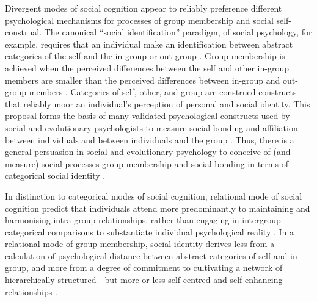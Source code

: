 \begin{CJK}{UTF8}{gbsn}
Divergent modes of social cognition appear to reliably preference different psychological mechanisms for processes of group membership and social self-construal.  The canonical ``social identification'' paradigm, of social psychology, for example, requires that an individual make an identification between abstract categories of the self and the in-group or out-group \citep{Turner1987}. Group membership is achieved when the perceived differences between the self and other in-group members are smaller than the perceived differences between in-group and out-group members \citep{Yuki2014}. Categories of self, other, and group are construed constructs that reliably moor an individual's perception of personal and social identity.  This proposal forms the basis of many validated psychological constructs used by social and evolutionary psychologists to measure social bonding and affiliation between individuals and between individuals and the group \citep{Swann2009,Wolf2015}.  Thus, there is a general persuasion in social and evolutionary psychology to conceive of (and measure) social processes group membership and social bonding in terms of categorical social identity \citep{Liu2015a}.


In distinction to categorical modes of social cognition, relational mode of social cognition predict that individuals attend more predominantly to maintaining and harmonising intra-group relationships, rather than engaging in intergroup categorical comparisons to substantiate individual psychological reality \citep{Yuki2003}.  In a relational mode of group membership, social identity derives less from a calculation of psychological distance between abstract categories of self and in-group, and more from a degree of commitment to cultivating a network of hierarchically structured---but more or less self-centred and self-enhancing---relationships \citep{Liu2009,Nisbett2003}.


\end{CJK}
